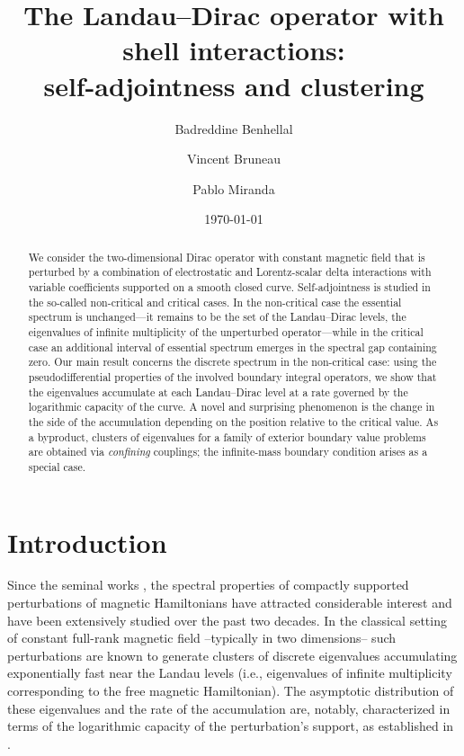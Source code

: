 \documentclass[11pt,a4paper,reqno,oneside]{amsproc}
\title[The Landau--Dirac operator with  shell interactions]{The Landau--Dirac operator with  shell interactions: \\self-adjointness and clustering}
\author[B. Benhellal]{Badreddine Benhellal}
\author[B. Vincent]{Vincent Bruneau}
\author[P. Miranda]{Pablo Miranda}
\date{\today}
\numberwithin{equation}{section}
\begin{document}
	\begin{abstract} 
	We consider the two-dimensional Dirac operator with  constant magnetic field that is  perturbed by a combination of electrostatic and Lorentz-scalar delta interactions with variable coefficients supported on a smooth closed curve. Self-adjointness is studied in the so-called non-critical and critical cases. In the non-critical case the essential spectrum is unchanged—it remains to be the set of the Landau--Dirac levels, the eigenvalues of infinite multiplicity of the unperturbed operator—while in the critical case an additional interval of essential spectrum emerges in the spectral gap containing zero. Our main result concerns the discrete spectrum in the non-critical case: using the pseudodifferential properties of the involved boundary integral operators, we show that the eigenvalues accumulate at each Landau--Dirac level at a rate governed by the logarithmic capacity of the curve.  A novel and surprising phenomenon is the change in the side of the accumulation depending on the position relative to the critical value. As a byproduct,  clusters of eigenvalues for a family of exterior boundary value problems are obtained via {\it confining} couplings; the infinite-mass boundary condition arises as a special case.  
	\end{abstract}
	\maketitle	
	\section{Introduction}
	Since the seminal works \cite{RaWa02,MeRo07}, the spectral properties of compactly supported perturbations of magnetic Hamiltonians have attracted considerable interest and have been extensively studied over the past two decades. In the classical setting of constant full-rank magnetic field --typically in two dimensions-- such perturbations are known to generate clusters of discrete eigenvalues accumulating exponentially fast  near the Landau levels (i.e., eigenvalues of infinite multiplicity corresponding to the free magnetic Hamiltonian). The asymptotic distribution of these eigenvalues and the rate of the accumulation are, notably, characterized in terms of the logarithmic capacity of the perturbation's support, as established in \cite{FiPu06}.
	
\end{document}
